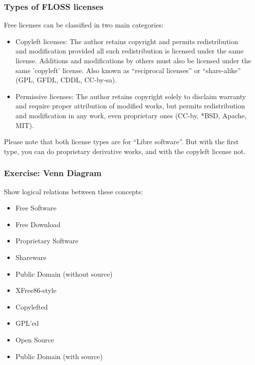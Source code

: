 \begin{frame}
\frametitle{Types of FLOSS licenses}
Free licenses can be classified in two main categories:\\\pause
\begin{itemize}
\item \alert{Copyleft licenses:} The author retains copyright and permits redistribution and modification provided all such redistribution is licensed under the same license. Additions and modifications by others must also be licensed under the same 'copyleft' license. Also known as ``reciprocal licenses'' or ``share-alike'' (GPL, GFDL, CDDL, CC-by-sa).\\\pause

\item \alert{Permissive licenses:} The author retains copyright solely to disclaim warranty and require proper attribution of modified works, but permits redistribution and modification in any work, even proprietary ones (CC-by, *BSD, Apache, MIT).\\\pause
\end{itemize}

Please note that both license types are for ``Libre software''. But with the first type, you can do proprietary derivative works, and with the copyleft license not.

\end{frame}


\begin{frame}
\frametitle{Exercise: Venn Diagram}

Show logical relations between these concepts:
\begin{itemize}
\item Free Software 
\item Free Download
\item Proprietary Software
\item Shareware 
\item Public Domain (without source)
\item XFree86-style
\item Copylefted
\item GPL'ed
\item Open Source
\item Public Domain (with source)
\end{itemize}

\end{frame}



